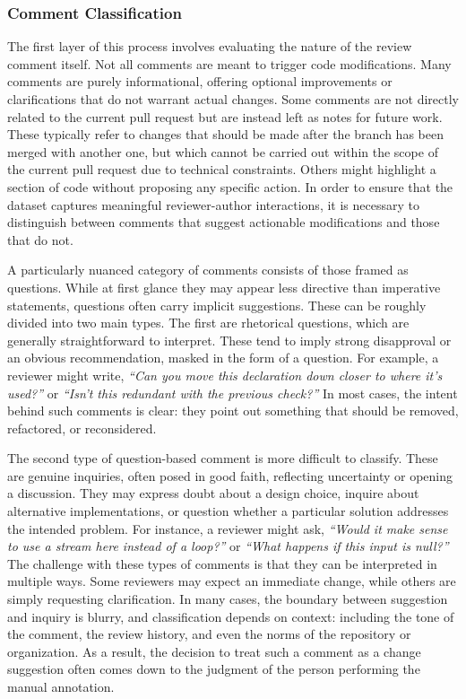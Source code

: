 \subsubsection{Comment Classification}
The first layer of this process involves evaluating the nature of the review comment itself. Not all
comments are meant to trigger code modifications. Many comments are purely informational, offering
optional improvements or clarifications that do not warrant actual changes. Some comments are not
directly related to the current pull request but are instead left as notes for future work. These
typically refer to changes that should be made after the branch has been merged with another one,
but which cannot be carried out within the scope of the current pull request due to technical
constraints. Others might highlight a section of code without proposing any specific action. In
order to ensure that the dataset captures meaningful reviewer-author interactions, it is necessary
to distinguish between comments that suggest actionable modifications and those that do not.

A particularly nuanced category of comments consists of those framed as questions. While at first
glance they may appear less directive than imperative statements, questions often carry implicit
suggestions. These can be roughly divided into two main types. The first are rhetorical questions,
which are generally straightforward to interpret. These tend to imply strong disapproval or an
obvious recommendation, masked in the form of a question. For example, a reviewer might write,
\textit{``Can you move this declaration down closer to where it's used?''} or \textit{``Isn't this
	redundant with the previous check?''} In most cases, the intent behind such comments is clear: they
point out something that should be removed, refactored, or reconsidered.

The second type of question-based comment is more difficult to classify. These are genuine
inquiries, often posed in good faith, reflecting uncertainty or opening a discussion. They may
express doubt about a design choice, inquire about alternative implementations, or question whether
a particular solution addresses the intended problem. For instance, a reviewer might ask,
\textit{“Would it make sense to use a stream here instead of a loop?”} or \textit{“What happens if
	this input is null?”} The challenge with these types of comments is that they can be interpreted in
multiple ways. Some reviewers may expect an immediate change, while others are simply requesting
clarification. In many cases, the boundary between suggestion and inquiry is blurry, and
classification depends on context: including the tone of the comment, the review history, and even
the norms of the repository or organization. As a result, the decision to treat such a comment as a
change suggestion often comes down to the judgment of the person performing the manual annotation.

